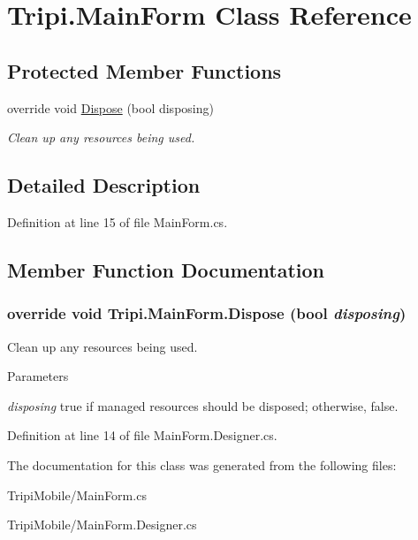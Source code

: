\hypertarget{class_tripi_1_1_main_form}{
\section{Tripi.MainForm Class Reference}
\label{class_tripi_1_1_main_form}
}
\subsection*{Protected Member Functions}
\begin{DoxyCompactItemize}
\item 
override void \hyperlink{class_tripi_1_1_main_form_a3322bd9e739900c243913830c97d4189}{Dispose} (bool disposing)
\begin{DoxyCompactList}\small\item\em Clean up any resources being used. \item\end{DoxyCompactList}\end{DoxyCompactItemize}


\subsection{Detailed Description}


Definition at line 15 of file MainForm.cs.

\subsection{Member Function Documentation}
\hypertarget{class_tripi_1_1_main_form_a3322bd9e739900c243913830c97d4189}{
\subsubsection[{Dispose}]{\setlength{\rightskip}{0pt plus 5cm}override void Tripi.MainForm.Dispose (bool {\em disposing})}}
\label{class_tripi_1_1_main_form_a3322bd9e739900c243913830c97d4189}


Clean up any resources being used. 
\begin{DoxyParams}{Parameters}
\item[{\em disposing}]true if managed resources should be disposed; otherwise, false.\end{DoxyParams}


Definition at line 14 of file MainForm.Designer.cs.

The documentation for this class was generated from the following files:\begin{DoxyCompactItemize}
\item 
TripiMobile/MainForm.cs\item 
TripiMobile/MainForm.Designer.cs\end{DoxyCompactItemize}
